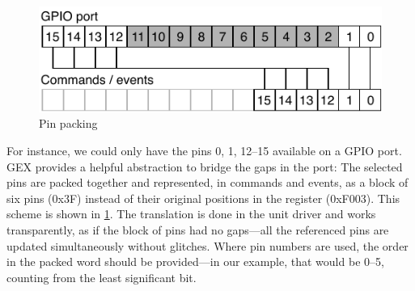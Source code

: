 \begin{figure}[h]
	\centering
	\includegraphics[scale=1] {img/pin-packing.pdf}
	\caption{\label{fig:pin_packing}Pin packing}
\end{figure}

For instance, we could only have the pins 0, 1, 12--15 available on a \gls{GPIO} port. GEX provides a helpful abstraction to bridge the gaps in the port: The selected pins are packed together and represented, in commands and events, as a block of six pins (0x3F) instead of their original positions in the register (0xF003). This scheme is shown in \cref{fig:pin_packing}. The translation is done in the unit driver and works transparently, as if the block of pins had no gaps---all the referenced pins are updated simultaneously without glitches. Where pin numbers are used, the order in the packed word should be provided---in our example, that would be 0--5, counting from the least significant bit.



















